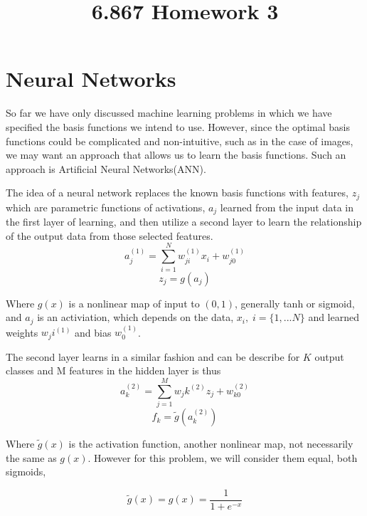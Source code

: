 \documentclass[12pt, twocolumn]{article}
\begin{document}
\title{6.867 Homework 3}
\maketitle

\section{Neural Networks}
So far we have only discussed machine learning problems in which we have specified the basis functions we intend to use. However, since the optimal basis functions could be complicated and non-intuitive, such as in the case of images, we may want an approach that allows us to learn the basis functions. Such an approach is Artificial Neural Networks(ANN). 

The idea of a neural network replaces the known basis functions with features, $z_j$ which are parametric functions of activations, $a_j$ learned from the input data in the first layer of learning, and then utilize a second layer to learn the relationship of the output data from those selected features. 
\begin{equation}
a_j^{(1)}= \sum_{i=1}^N w_{ji}^{(1)} x_i+w_{j0}^{(1)}
\end{equation}
\begin{equation}
z_j= g(a_j)
\end{equation}

Where $g(x)$ is a nonlinear map of input to $(0,1)$, generally tanh or sigmoid, and $a_j$ is an activiation, which depends on the data, $x_i, \; i=\{1,...N\}$  and learned weights $w_ji^{(1)}$ and bias $w_0^{(1)}$. 

The second layer learns in a similar fashion and can be describe for $K$ output classes and M features in the  hidden layer  is thus 
\begin{equation}
a_k^{(2)}= \sum_{j=1}^M w_jk^{(2)} z_j+w_{k0}^{(2)}
\end{equation}
\begin{equation}
f_k= \tilde{g}(a_k^{(2)})
\end{equation}
 
Where $\tilde{g}(x)$ is the activation function, another nonlinear map, not necessarily the same as $g(x)$. However for this problem, we will consider them equal, both sigmoids, 

\begin{equation}
\tilde{g}(x)= g(x) = \frac{1}{ 1+e^{-x}}
\end{equation}
\end{document}
